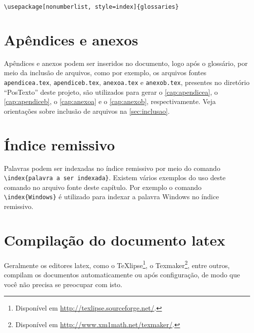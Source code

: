 \begin{SingleSpacing}%
\begin{verbatim}
\usepackage[nonumberlist, style=index]{glossaries}
\end{verbatim}
\end{SingleSpacing}

\section{Apêndices e anexos}\label{sec:apendiceseanexos}

Apêndices e anexos podem ser inseridos no documento, logo após o glossário, por meio da inclusão de arquivos, como por exemplo, os arquivos fontes \texttt{apendicea.tex}, \texttt{apendiceb.tex}, \texttt{anexoa.tex} e \texttt{anexob.tex}, presentes no diretório ``PosTexto'' deste projeto, são utilizados para gerar o \autoref{cap:apendicea}, o \autoref{cap:apendiceb}, o \autoref{cap:anexoa} e o \autoref{cap:anexob}, respectivamente. Veja orientações sobre inclusão de arquivos na \autoref{sec:inclusao}.

\section{Índice remissivo}\label{sec:indice}

Palavras podem ser indexadas no índice remissivo por meio do comando \verb|\index{palavra a ser indexada}|. Existem vários exemplos do uso deste comando no arquivo fonte deste capítulo. Por exemplo o comando \verb|\index{Windows}| é utilizado para indexar a palavra Windows no índice remissivo.

\section{Compilação do documento latex}\label{sec:compilar}

Geralmente os editores \gls{latex}, como o TeXlipse\footnote{Disponível em \url{http://texlipse.sourceforge.net/}.}, o Texmaker\footnote{Disponível em \url{http://www.xm1math.net/texmaker/}.}, entre outros, compilam os documentos automaticamente ou após configuração, de modo que você não precisa se preocupar com isto.

